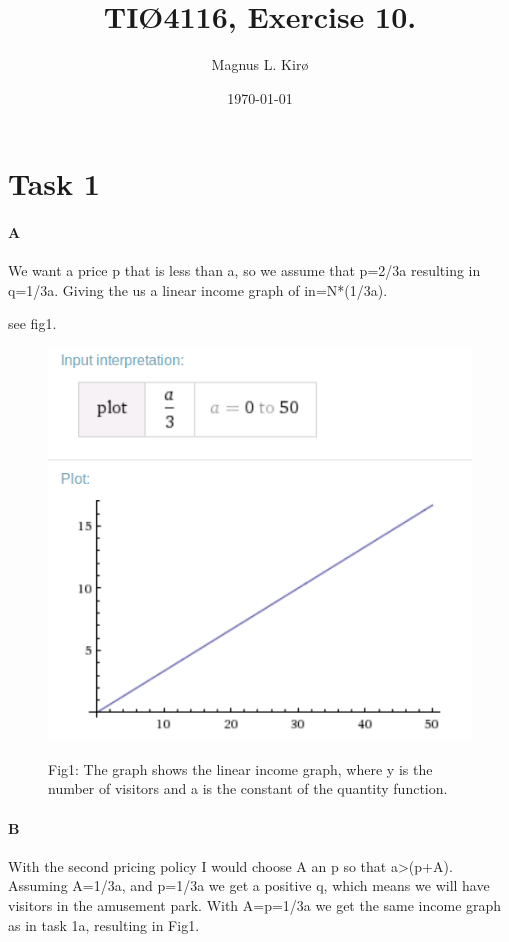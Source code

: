 \documentclass[12pt, a4paper]{article}
\title{
	TIØ4116, Exercise 10. 
}
\author{
	Magnus L. Kirø \\
}
\date{\today}
\begin{document}
\maketitle
{}

\section{Task 1}
\paragraph{A}
We want a price p that is less than a, so we assume that p=2/3a resulting in
q=1/3a. Giving the us a linear income graph of in=N*(1/3a). 

see fig1. 

\begin{figure}[htb]
    \centering
    \includegraphics[width=\textwidth]{plot} 
    \label{fig:plot}
    \caption{}
Fig1: The graph shows the linear income graph, where y is the number of visitors and a
is the constant of the quantity function. 
\end{figure}

\paragraph{B}
With the second pricing policy I would choose A an p so that a>(p+A). Assuming
A=1/3a, and p=1/3a we get a positive q, which means we will have visitors in
the amusement park. With A=p=1/3a we get the same income graph as in task 1a,
resulting in Fig1.  
\end{document}
